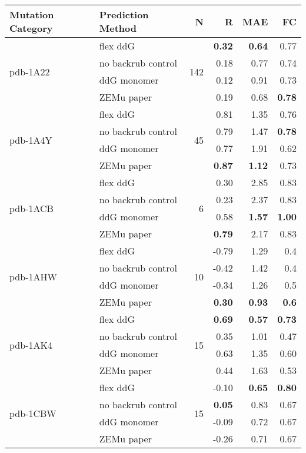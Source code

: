 {\small
\begin{longtable}{llrrrr}
\toprule
Mutation Category &   Prediction Method &   N &     R &  MAE &   FC \\
\midrule
 \multirow{ 4}{*}{pdb-1A22} & flex ddG & \multirow{ 4}{*}{142} & \textbf{0.32} & \textbf{0.64} & 0.77  \\
 & no backrub control & & 0.18 & 0.77 & 0.74  \\
 & ddG monomer & & 0.12 & 0.91 & 0.73  \\
 & ZEMu paper & & 0.19 & 0.68 & \textbf{0.78}  \\
\hline
 \multirow{ 4}{*}{pdb-1A4Y} & flex ddG & \multirow{ 4}{*}{45} & 0.81 & 1.35 & 0.76  \\
 & no backrub control & & 0.79 & 1.47 & \textbf{0.78}  \\
 & ddG monomer & & 0.77 & 1.91 & 0.62  \\
 & ZEMu paper & & \textbf{0.87} & \textbf{1.12} & 0.73  \\
\hline
 \multirow{ 4}{*}{pdb-1ACB} & flex ddG & \multirow{ 4}{*}{6} & 0.30 & 2.85 & 0.83  \\
 & no backrub control & & 0.23 & 2.37 & 0.83  \\
 & ddG monomer & & 0.58 & \textbf{1.57} & \textbf{1.00}  \\
 & ZEMu paper & & \textbf{0.79} & 2.17 & 0.83  \\
\hline
 \multirow{ 4}{*}{pdb-1AHW} & flex ddG & \multirow{ 4}{*}{10} & -0.79 & 1.29 & 0.4  \\
 & no backrub control & & -0.42 & 1.42 & 0.4  \\
 & ddG monomer & & -0.34 & 1.26 & 0.5  \\
 & ZEMu paper & & \textbf{0.30} & \textbf{0.93} & \textbf{0.6}  \\
\hline
 \multirow{ 4}{*}{pdb-1AK4} & flex ddG & \multirow{ 4}{*}{15} & \textbf{0.69} & \textbf{0.57} & \textbf{0.73}  \\
 & no backrub control & & 0.35 & 1.01 & 0.47  \\
 & ddG monomer & & 0.63 & 1.35 & 0.60  \\
 & ZEMu paper & & 0.44 & 1.63 & 0.53  \\
\hline
 \multirow{ 4}{*}{pdb-1CBW} & flex ddG & \multirow{ 4}{*}{15} & -0.10 & \textbf{0.65} & \textbf{0.80}  \\
 & no backrub control & & \textbf{0.05} & 0.83 & 0.67  \\
 & ddG monomer & & -0.09 & 0.72 & 0.67  \\
 & ZEMu paper & & -0.26 & 0.71 & 0.67  \\

\end{longtable}}
